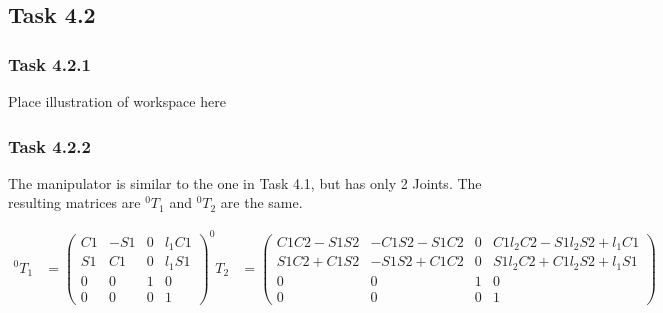 \subsection*{Task 4.2}

\subsubsection*{Task 4.2.1}
Place illustration of workspace here

\subsubsection*{Task 4.2.2}
The manipulator is similar to the one in Task 4.1, but has only 2 Joints. The resulting matrices are $^0T_1$ and $^0T_2$ are the same.

\begin{align*}
^0T_1 &= 
\begin{pmatrix}
C1 & -S1 & 0 & l_1 C1\\
S1 &  C1 & 0 & l_1 S1\\
0  &  0  & 1 & 0\\
0  &  0  & 0 & 1
\end{pmatrix}
^0T_2 &= 
\begin{pmatrix}
C1C2-S1S2 & -C1S2-S1C2 & 0 & C1l_2C2-S1l_2S2+l_1C1\\
S1C2+C1S2 & -S1S2+C1C2 & 0 & S1l_2C2+C1l_2S2+l_1S1\\
0  &  0  & 1 & 0\\
0  &  0  & 0 & 1
\end{pmatrix}
\end{align*}